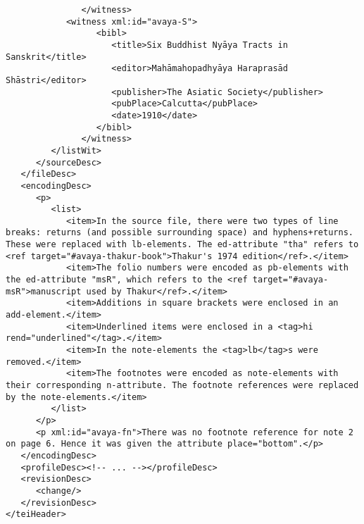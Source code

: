 \documentclass[article,12pt,a4paper]{memoir}%
\begin{document}
\begin{verbatim}
	           </witness>
            <witness xml:id="avaya-S">
	              <bibl>
	                 <title>Six Buddhist Nyāya Tracts in Sanskrit</title>
	                 <editor>Mahāmahopadhyāya Haraprasād Shāstri</editor>
	                 <publisher>The Asiatic Society</publisher>
	                 <pubPlace>Calcutta</pubPlace>
	                 <date>1910</date>
	              </bibl>
	           </witness>
         </listWit>
      </sourceDesc>
   </fileDesc>
   <encodingDesc>
      <p>
         <list>
            <item>In the source file, there were two types of line breaks: returns (and possible surrounding space) and hyphens+returns. These were replaced with lb-elements. The ed-attribute "tha" refers to <ref target="#avaya-thakur-book">Thakur's 1974 edition</ref>.</item>
            <item>The folio numbers were encoded as pb-elements with the ed-attribute "msR", which refers to the <ref target="#avaya-msR">manuscript used by Thakur</ref>.</item>
            <item>Additions in square brackets were enclosed in an add-element.</item>
            <item>Underlined items were enclosed in a <tag>hi rend="underlined"</tag>.</item>
            <item>In the note-elements the <tag>lb</tag>s were removed.</item>
            <item>The footnotes were encoded as note-elements with their corresponding n-attribute. The footnote references were replaced by the note-elements.</item>
         </list>
      </p>
      <p xml:id="avaya-fn">There was no footnote reference for note 2 on page 6. Hence it was given the attribute place="bottom".</p>
   </encodingDesc>
   <profileDesc><!-- ... --></profileDesc>
   <revisionDesc>
      <change/>
   </revisionDesc>
</teiHeader>
	 \end{verbatim}
       
      \clearpage
      \begin{english}
      \printshorthands
      \printbibliography
      \end{english}
    
\end{document}
